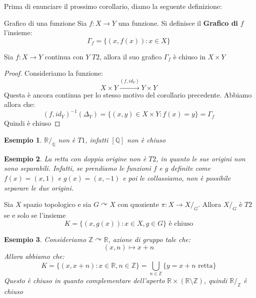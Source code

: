 \documentclass[11pt,a4paper,twoside]{article}
\newtheorem{es}{Esempio}
\theoremstyle{definition}
\begin{document}
Prima di enunciare il prossimo corollario, diamo la seguente definizione:

\begin{defn}{Grafico di una funzione}{}
	Sia $f:X \to Y$ una funzione. Si definisce il \textbf{Grafico di }$f$ l'insieme:
	\[ \Gamma_f = \{(x, f(x)) : x \in X\} \]
\end{defn}

\begin{cor}{}{}
	Sia $f:X \to Y$ continua con $Y$ $T2$, allora il suo grafico $\Gamma_f$ è chiuso in $X \times Y$
\end{cor}

\begin{proof}
	Consideriamo la funzione:
	\[ X\times Y \xrightarrow{(f, id_Y)} Y\times Y \]
	Questa è ancora continua per lo stesso motivo del corollario precedente. Abbiamo allora che:
	\[ (f, id_Y)^{-1}(\Delta_Y) = \{ (x,y) \in X \times Y: f(x) = y \} = \Gamma_f \]
	Quindi è chiuso
\end{proof}

\begin{es}
	$\mathbb R/_\mathbb Q$ non è $T1$, infatti $[\mathbb Q]$ non è chiuso
\end{es}

\begin{es}
	La retta con doppia origine non è $T2$, in quanto le sue origini non sono separabili. Infatti, se prendiamo le funzioni $f$ e $g$ definite come $f(x) = (x,1)$ e $g(x) = (x, -1)$ e poi le collassiamo, non è possibile separare le due origini.
\end{es}

\begin{prop}{}{}
	Sia $X$ spazio topologico e sia $G \curvearrowright X$ con quoziente $\pi: X \to X/_G$. Allora $X/_G$ è $T2$ se e solo se l'insieme
	\[ K = \{(x, g(x)) : x \in X, g \in G\} \text{ è chiuso} \]
\end{prop}

\begin{es}
	Consideriamo $\mathbb Z \curvearrowright \mathbb R$, azione di gruppo tale che:
	\[ (x, n) \mapsto x+n \]
	Allora abbiamo che:
	\[ K = \{ (x, x+n) : x \in \mathbb R, n \in \mathbb Z \} = \bigcup_{n \in \mathbb Z} \{ y = x+n \text{ retta} \}\]
	Questo è chiuso in quanto complementare dell'aperto $\mathbb R \times (\mathbb R \setminus \mathbb Z)$, quindi $\mathbb R/_\mathbb Z$ è chiuso
\end{es}
\end{document}

